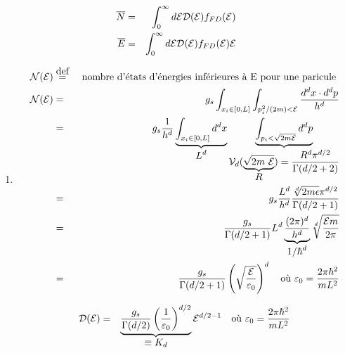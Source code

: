             \begin{eqnarray*}
                \overline{N} & = & \int_0^\infty d {\mathcal E} {\mathcal D}( {\mathcal E}) f_{FD} ( {\mathcal E})\\
                \overline{E} & = & \int_0^\infty d {\mathcal E} {\mathcal D}( {\mathcal E}) f_{FD} ( {\mathcal E}){\mathcal E} 
            \end{eqnarray*}


                  
            \begin{enumerate}
                \item 
                \begin{eqnarray*}
                    {\mathcal N}( {\mathcal E} )  & \overset{\mbox{def}}{=} & \mbox{ nombre d'états d'énergies inférieures à E pour une paricule } \\
                    {\mathcal N}( {\mathcal E} )  & = &  g_s  \int_{x_i \in [ 0  , L ] } \int_{p_i^2/(2m) < {\mathcal E} }  \frac{ d^dx \cdot d^dp }{ h^d }\\
                     & = &     g_s  \frac{1}{h^d}\underbrace{\int_{x_i \in [ 0  , L ] }  d^dx}_{\displaystyle L^d}   \underbrace{\int_{p_i < \sqrt{2m {\mathcal E} } } d^dp }_{\displaystyle  {\mathcal V}_d ( \underbrace{\sqrt{2m\ {\mathcal E} }}_{\displaystyle R}  )  = \frac{ R^d \pi ^{d/2 }}{\Gamma ( d/2 +2 ) }}\\
                     & = & g_s  \frac{L^d}{h^d} \frac{ \sqrt[d]{2m\epsilon}  \pi ^{d/2 }}{\Gamma ( d/2 + 1) }\\
                      & = & \frac{g_s}{\Gamma ( d/2 + 1 ) }  L^d \underbrace{\frac{(2\pi)^d}{h^d}}_{\displaystyle 1/ \hbar^d}   \sqrt[d]{ \frac{ {\mathcal E}  m }{ 2\pi } }\\
                      & = & \frac{g_s}{\Gamma ( d/2 +1 ) } \left (  \sqrt{ \frac{ {\mathcal E}   }{ \varepsilon_0 } } \right )^d  \quad \mbox{où } \varepsilon_0 = \frac{2\pi \hbar^2}{ mL^2} 
                \end{eqnarray*}
                
                \begin{eqnarray*}
                     {\mathcal D} ( {\mathcal E} ) & = &  \underbrace{ \frac{g_s}{\Gamma ( d/2 ) }  \left (  \frac{ 1  }{ \varepsilon_0 }\right )^{d/2}}_{\displaystyle \equiv K_d}  {\mathcal E}^{ d/2 - 1 }   \quad \mbox{où } \varepsilon_0 = \frac{2\pi \hbar^2}{ mL^2}  
                \end{eqnarray*}
                

\end{enumerate}

